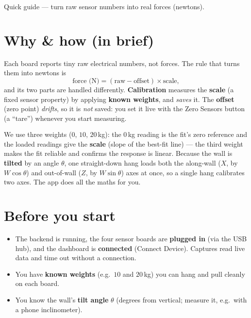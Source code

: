 \documentclass[11pt,a4paper]{article}
\begin{document}
%
  {Quick guide --- turn raw sensor numbers into real forces (newtons).}

\section{Why \& how (in brief)}
Each board reports tiny raw electrical numbers, not forces. The rule that turns them
into newtons is
\[
  \text{force (N)} = (\text{raw} - \text{offset})\times\text{scale},
\]
and its two parts are handled differently. \textbf{Calibration} measures the
\textbf{scale} (a fixed sensor property) by applying \textbf{known weights}, and
\emph{saves} it. The \textbf{offset} (zero point) \emph{drifts}, so it is \emph{not}
saved: you set it live with the \textsf{Zero Sensors} button (a ``tare'') whenever
you start measuring.

We use three weights ($0$, $10$, $20$\,kg): the $0$\,kg reading is the fit's zero
reference and the loaded readings give the \textbf{scale} (slope of the best-fit
line) --- the third weight makes the fit reliable and confirms the response is
linear. Because the wall is \textbf{tilted} by an angle $\theta$, one straight-down
hang loads both the along-wall ($X$, by $W\cos\theta$) and out-of-wall ($Z$, by
$W\sin\theta$) axes at once, so a single hang calibrates two axes. The app does all
the maths for you.

\section{Before you start}
\begin{itemize}
  \item The backend is running, the four sensor boards are \textbf{plugged in}
        (via the USB hub), and the dashboard is \textbf{connected}
        (\textsf{Connect Device}). Captures read live data and time out without a
        connection.
  \item You have \textbf{known weights} (e.g.\ $10$ and $20$\,kg) you can hang and
        pull cleanly on each board.
  \item You know the wall's \textbf{tilt angle} $\theta$ (degrees from vertical;
        measure it, e.g.\ with a phone inclinometer).
\end{itemize}

\end{document}
